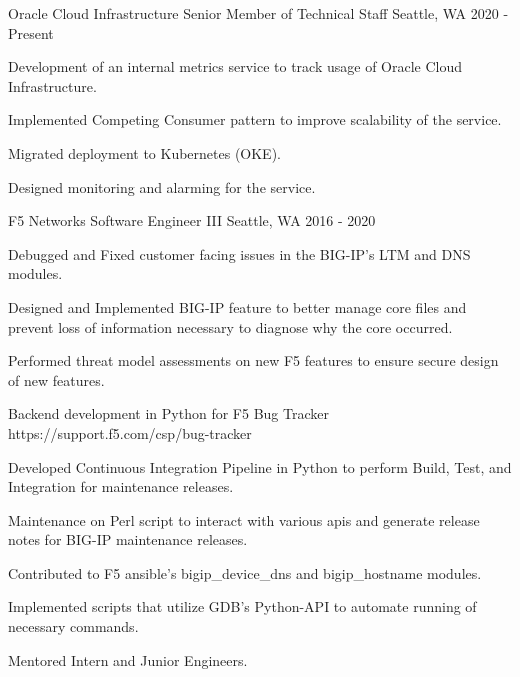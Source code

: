 

\begin{cventries}

\cventry
{Oracle Cloud Infrastructure} %
{Senior Member of Technical Staff} %
{Seattle, WA} %
{2020 - Present} %
{
  \begin{cvitems} %
    \item {Development of an internal metrics service to track usage of Oracle Cloud Infrastructure.}
    \item {Implemented Competing Consumer pattern to improve scalability of the service.}
    \item {Migrated deployment to Kubernetes (OKE).}
    \item {Designed monitoring and alarming for the service.}
  \end{cvitems}
}

  \cventry
    {F5 Networks} %
    {Software Engineer III} %
    {Seattle, WA} %
    {2016 - 2020} %
    {
      \begin{cvitems} %
        \item {Debugged and Fixed customer facing issues in the BIG-IP's LTM and DNS modules.}
        \item {Designed and Implemented BIG-IP feature to better manage core files and prevent loss of information necessary to diagnose why the core occurred.}
        \item {Performed threat model assessments on new F5 features to ensure secure design of new features.}
        \item {Backend development in Python for F5 Bug Tracker https://support.f5.com/csp/bug-tracker}
        \item {Developed Continuous Integration Pipeline in Python to perform Build, Test, and Integration for maintenance releases.}
        \item {Maintenance on Perl script to interact with various apis and generate release notes for BIG-IP maintenance releases.}
        \item {Contributed to F5 ansible's bigip\_device\_dns and bigip\_hostname modules.}
        \item {Implemented scripts that utilize GDB's Python-API to automate running of necessary commands.}
        \item {Mentored Intern and Junior Engineers.}
      \end{cvitems}
    }


\end{cventries}
